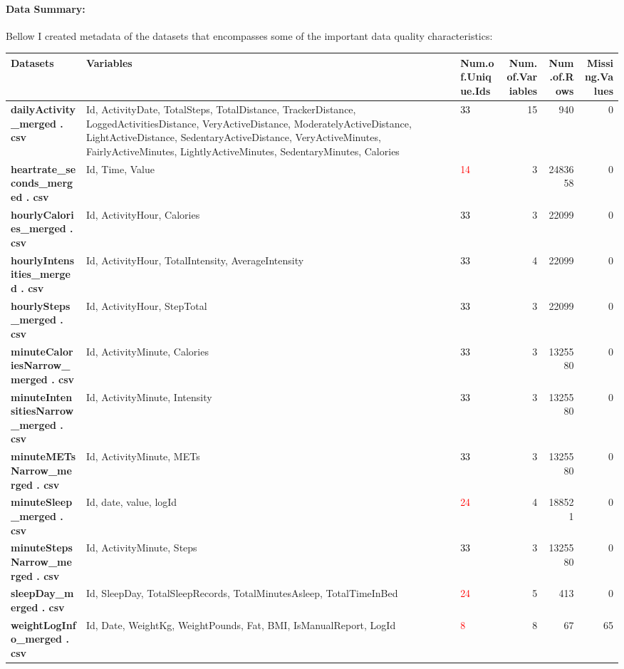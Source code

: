 \documentclass[
]{article}
\begin{document}
\hypertarget{data-summary}{%
\paragraph{Data Summary:}\label{data-summary}}

Bellow I created metadata of the datasets that encompasses some of the
important data quality characteristics:

\begin{table}
\centering
\begin{tabular}[t]{>{}l||>{\raggedright\arraybackslash}p{30em}|l|r|r|r}
\hline
Datasets & Variables & Num.of.Unique.Ids & Num.of.Variables & Num.of.Rows & Missing.Values\\
\hline
\textbf{dailyActivity_merged . csv} & Id, ActivityDate, TotalSteps, TotalDistance, TrackerDistance, LoggedActivitiesDistance, VeryActiveDistance, ModeratelyActiveDistance, LightActiveDistance, SedentaryActiveDistance, VeryActiveMinutes, FairlyActiveMinutes, LightlyActiveMinutes, SedentaryMinutes, Calories & \textcolor{black}{33} & 15 & 940 & 0\\
\hline
\textbf{heartrate_seconds_merged . csv} & Id, Time, Value & \textcolor{red}{14} & 3 & 2483658 & 0\\
\hline
\textbf{hourlyCalories_merged . csv} & Id, ActivityHour, Calories & \textcolor{black}{33} & 3 & 22099 & 0\\
\hline
\textbf{hourlyIntensities_merged . csv} & Id, ActivityHour, TotalIntensity, AverageIntensity & \textcolor{black}{33} & 4 & 22099 & 0\\
\hline
\textbf{hourlySteps_merged . csv} & Id, ActivityHour, StepTotal & \textcolor{black}{33} & 3 & 22099 & 0\\
\hline
\textbf{minuteCaloriesNarrow_merged . csv} & Id, ActivityMinute, Calories & \textcolor{black}{33} & 3 & 1325580 & 0\\
\hline
\textbf{minuteIntensitiesNarrow_merged . csv} & Id, ActivityMinute, Intensity & \textcolor{black}{33} & 3 & 1325580 & 0\\
\hline
\textbf{minuteMETsNarrow_merged . csv} & Id, ActivityMinute, METs & \textcolor{black}{33} & 3 & 1325580 & 0\\
\hline
\textbf{minuteSleep_merged . csv} & Id, date, value, logId & \textcolor{red}{24} & 4 & 188521 & 0\\
\hline
\textbf{minuteStepsNarrow_merged . csv} & Id, ActivityMinute, Steps & \textcolor{black}{33} & 3 & 1325580 & 0\\
\hline
\textbf{sleepDay_merged . csv} & Id, SleepDay, TotalSleepRecords, TotalMinutesAsleep, TotalTimeInBed & \textcolor{red}{24} & 5 & 413 & 0\\
\hline
\textbf{weightLogInfo_merged . csv} & Id, Date, WeightKg, WeightPounds, Fat, BMI, IsManualReport, LogId & \textcolor{red}{8} & 8 & 67 & 65\\
\hline
\end{tabular}
\end{table}
\end{document}
